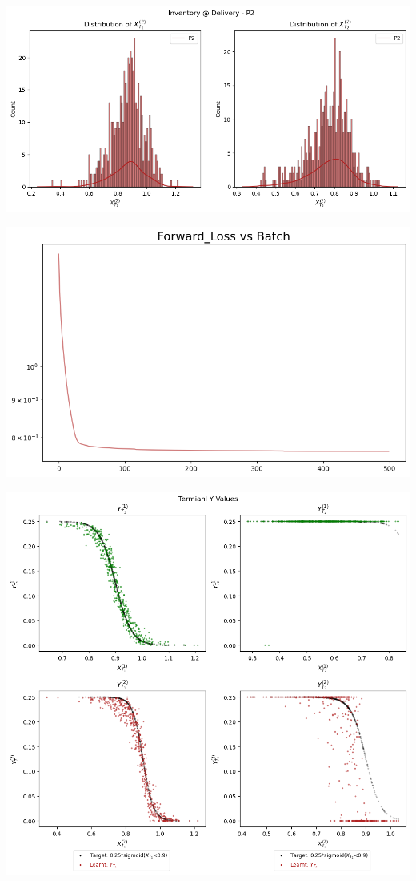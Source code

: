 \documentclass{article}
\begin{document}
{\includegraphics{Illustration_Diagrams/Seprt-2A2P-Sigmoid-ResExamples/InvPreDeli_P2.png}

\includegraphics{Illustration_Diagrams/Seprt-2A2P-Sigmoid-ResExamples/Loss.png}

\includegraphics{Illustration_Diagrams/Seprt-2A2P-Sigmoid-ResExamples/sigmoid_target.png}

}
\end{document}

